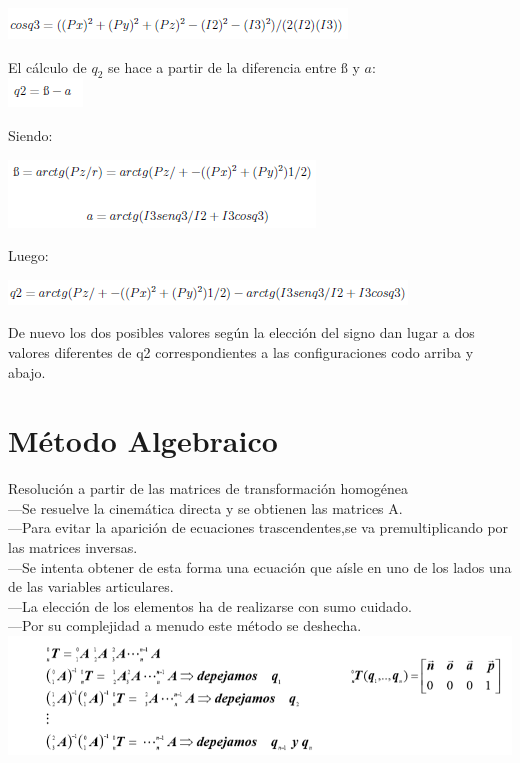 \documentclass[11pt,a4paper,oldfontcommands,oneside]{memoir}
\begin{document}
\includegraphics[scale=1.5]{5} 

El cálculo de $q_2$ se hace a partir de la diferencia entre $ß$ y $a$:\\

\includegraphics[scale=1.5]{6} 

Siendo:

\includegraphics[scale=1.5]{7} 


Luego:

\includegraphics[scale=1.5]{8} 

De nuevo los dos posibles valores según la elección del signo dan lugar a dos valores diferentes de q2 correspondientes a las configuraciones codo arriba y abajo.

\chapter{Método Algebraico}
Resolución a partir de las matrices de transformación homogénea\\ 
---Se resuelve la cinemática directa y se obtienen las matrices A.\\
---Para evitar la aparición de ecuaciones trascendentes,se va  premultiplicando por las matrices inversas.\\
---Se intenta obtener de esta forma una ecuación que aísle en uno  de los lados una de las variables articulares.\\
---La elección de los elementos ha de realizarse con sumo cuidado.\\
---Por su complejidad a menudo este método se deshecha.\\


\includegraphics[scale=.5]{ec3.png}
\end{document}
